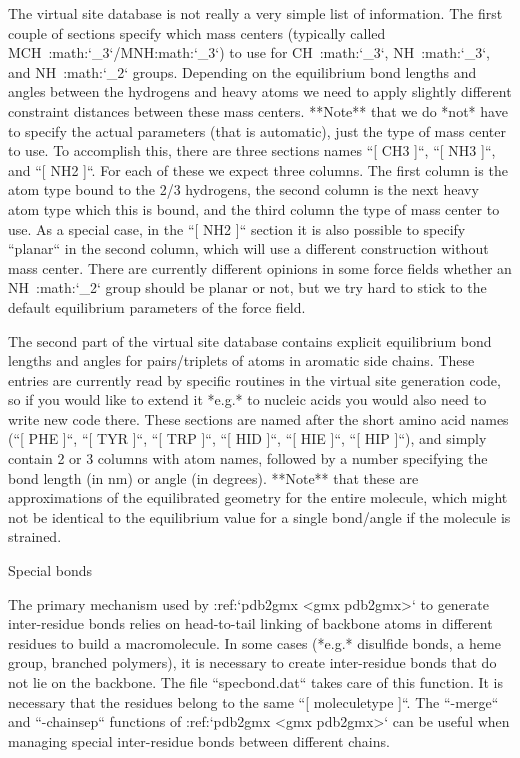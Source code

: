 The virtual site database is not really a very simple list of
information. The first couple of sections specify which mass centers
(typically called MCH\ :math:`_3`/MNH:math:`_3`) to use for
CH\ :math:`_3`, NH\ :math:`_3`, and NH\ :math:`_2` groups. Depending on
the equilibrium bond lengths and angles between the hydrogens and heavy
atoms we need to apply slightly different constraint distances between
these mass centers. **Note** that we do *not* have to specify the actual
parameters (that is automatic), just the type of mass center to use. To
accomplish this, there are three sections names ``[ CH3 ]``,
``[ NH3 ]``, and ``[ NH2 ]``. For each of these we expect three columns.
The first column is the atom type bound to the 2/3 hydrogens, the second
column is the next heavy atom type which this is bound, and the third
column the type of mass center to use. As a special case, in the
``[ NH2 ]`` section it is also possible to specify ``planar`` in the
second column, which will use a different construction without mass
center. There are currently different opinions in some force fields
whether an NH\ :math:`_2` group should be planar or not, but we try hard
to stick to the default equilibrium parameters of the force field.

The second part of the virtual site database contains explicit
equilibrium bond lengths and angles for pairs/triplets of atoms in
aromatic side chains. These entries are currently read by specific
routines in the virtual site generation code, so if you would like to
extend it *e.g.* to nucleic acids you would also need to write new code
there. These sections are named after the short amino acid names
(``[ PHE ]``, ``[ TYR ]``, ``[ TRP ]``, ``[ HID ]``, ``[ HIE ]``,
``[ HIP ]``), and simply contain 2 or 3 columns with atom names,
followed by a number specifying the bond length (in nm) or angle (in
degrees). **Note** that these are approximations of the equilibrated
geometry for the entire molecule, which might not be identical to the
equilibrium value for a single bond/angle if the molecule is strained.

Special bonds
~~~~~~~~~~~~~

The primary mechanism used by
:ref:`pdb2gmx <gmx pdb2gmx>` to generate
inter-residue bonds relies on head-to-tail linking of backbone atoms in
different residues to build a macromolecule. In some cases (*e.g.*
disulfide bonds, a heme
group, branched
polymers), it is necessary to
create inter-residue bonds that do not lie on the backbone. The file
``specbond.dat`` takes
care of this function. It is necessary that the residues belong to the
same ``[ moleculetype ]``. The ``-merge`` and
``-chainsep`` functions of :ref:`pdb2gmx <gmx pdb2gmx>` can be
useful when managing special inter-residue bonds between different
chains.

